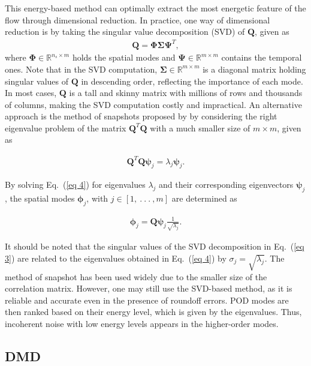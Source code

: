 \documentclass[a4paper,fleqn]{cas-sc}
\begin{document}
	This energy-based method can optimally extract the most energetic feature of the flow through dimensional reduction. In practice, one way of dimensional reduction is by taking the singular value decomposition (SVD) of $\mathbf{Q}$, given as
	\begin{align}
		\mathbf{Q} = \mathbf{\Phi} \mathbf{\Sigma} \mathbf{\Psi}^T ,\label{eq 3}
	\end{align}
	\noindent where $\mathbf{\Phi} \in \mathbb{R}^{n_s\times m}$ holds the spatial modes and $\mathbf{\Psi}\in \mathbb{R}^{m\times m}$ contains the temporal ones. Note that in the SVD computation, $\mathbf{\Sigma}\in \mathbb{R}^{m\times m}$ is a diagonal matrix holding singular values of $\mathbf{Q}$ in descending order, reflecting the importance of each mode. In most cases, $\mathbf{Q}$ is a tall and skinny matrix with millions of rows and thousands of columns, making the SVD computation costly and impractical. An alternative approach is the method of snapshots proposed by \citet{Sirovich1987} by considering the right eigenvalue problem of the matrix $\mathbf{Q}^T\mathbf{Q}$ with a much smaller size of $m\times m$, given as 
	
	\begin{align}
		\mathbf{Q}^T\mathbf{Q}\boldsymbol{\psi} _j = \lambda _j \boldsymbol{\psi} _j.\label{eq 4}
	\end{align}
	
	\noindent By solving Eq.~(\ref{eq 4}) for eigenvalues $\lambda _j$ and their corresponding eigenvectors $\boldsymbol{\psi} _j$, the spatial modes $\boldsymbol{\phi} _j$, with $j\in [1,~.~.~.~, m]$ are determined as
	
	\begin{align}
		\boldsymbol{\phi} _j = \mathbf{Q} \boldsymbol{\psi} _j \frac{1}{\sqrt{\lambda _j}}.\label{eq 5}
	\end{align}
	
	\noindent It should be noted that the singular values of the SVD decomposition in Eq.~(\ref{eq 3}) are related to the eigenvalues obtained in Eq.~(\ref{eq 4}) by $\sigma_j = \sqrt{\lambda_j}$. The method of snapshot has been used widely due to the smaller size of the correlation matrix. However, one may still use the SVD-based method, as it is reliable and accurate even in the presence of roundoff errors. POD modes are then ranked based on their energy level, which is given by the eigenvalues. Thus, incoherent noise with low energy levels appears in the higher-order modes.
	
	\subsection{DMD}
	\label{DMD}
	
\end{document}
